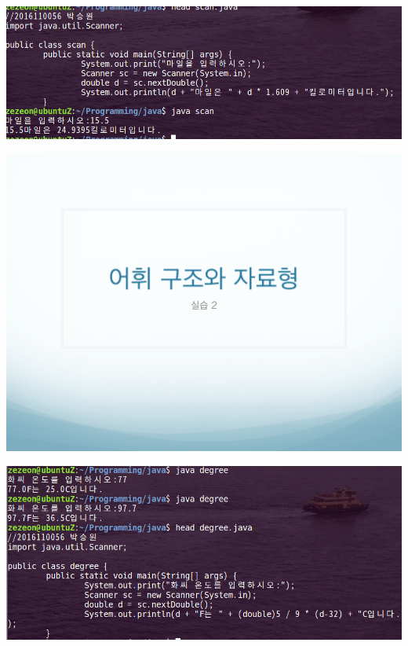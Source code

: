 \documentclass[12pt,a4paper]{article}
\begin{document}

\includegraphics[width=\textwidth]{scan.png}	

\includegraphics[page=13, width=\textwidth]{2.pdf}

\includegraphics[width=\textwidth]{degree.png}	
\end{document}
